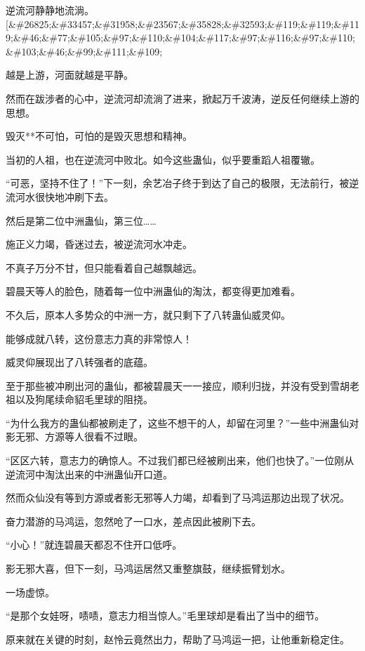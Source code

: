 
\begin{this_body}

逆流河静静地流淌。[\&\#26825;\&\#33457;\&\#31958;\&\#23567;\&\#35828;\&\#32593;\&\#119;\&\#119;\&\#119;\&\#46;\&\#77;\&\#105;\&\#97;\&\#110;\&\#104;\&\#117;\&\#97;\&\#116;\&\#97;\&\#110;\&\#103;\&\#46;\&\#99;\&\#111;\&\#109;

越是上游，河面就越是平静。

然而在跋涉者的心中，逆流河却流淌了进来，掀起万千波涛，逆反任何继续上游的思想。

毁灭**不可怕，可怕的是毁灭思想和精神。

当初的人祖，也在逆流河中败北。如今这些蛊仙，似乎要重蹈人祖覆辙。

“可恶，坚持不住了！”下一刻，余艺冶子终于到达了自己的极限，无法前行，被逆流河水很快地冲刷下去。

然后是第二位中洲蛊仙，第三位……

施正义力竭，昏迷过去，被逆流河水冲走。

不真子万分不甘，但只能看着自己越飘越远。

碧晨天等人的脸色，随着每一位中洲蛊仙的淘汰，都变得更加难看。

不久后，原本人多势众的中洲一方，就只剩下了八转蛊仙威灵仰。

能够成就八转，这份意志力真的非常惊人！

威灵仰展现出了八转强者的底蕴。

至于那些被冲刷出河的蛊仙，都被碧晨天一一接应，顺利归拢，并没有受到雪胡老祖以及狗尾续命貂毛里球的阻挠。

“为什么我方的蛊仙都被刷走了，这些不想干的人，却留在河里？”一些中洲蛊仙对影无邪、方源等人很看不过眼。

“区区六转，意志力的确惊人。不过我们都已经被刷出来，他们也快了。”一位刚从逆流河中淘汰出来的中洲蛊仙开口道。

然而众仙没有等到方源或者影无邪等人力竭，却看到了马鸿运那边出现了状况。

奋力潜游的马鸿运，忽然呛了一口水，差点因此被刷下去。

“小心！”就连碧晨天都忍不住开口低呼。

影无邪大喜，但下一刻，马鸿运居然又重整旗鼓，继续振臂划水。

一场虚惊。

“是那个女娃呀，啧啧，意志力相当惊人。”毛里球却是看出了当中的细节。

原来就在关键的时刻，赵怜云竟然出力，帮助了马鸿运一把，让他重新稳定住。


\end{this_body}
